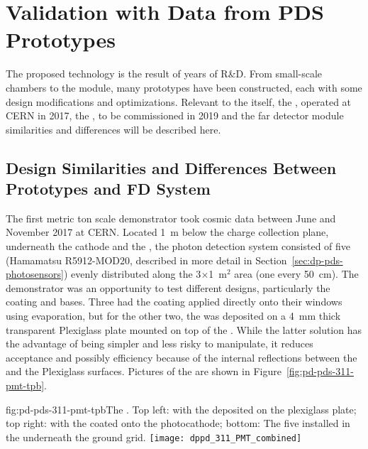 \section{Validation with Data from PDS Prototypes}
\label{sec:dp-pds-prototypes}

The    proposed technology is the result of years of R\&D. From small-scale chambers to the  module, many prototypes have been constructed, each with some design modifications and optimizations. 
Relevant to the  itself, the , operated at CERN in 2017, the , to be commissioned in 2019 and the  far detector module similarities and differences will be described here.

\subsection{Design Similarities and Differences Between Prototypes and FD System}

The first metric ton scale   demonstrator took cosmic data between June and November \num{2017} at CERN. 
Located \SI{1}{m} below the charge collection plane, underneath the cathode and the , the photon detection system consisted of five  (Hamamatsu R5912-MOD20, described in more detail in Section~\ref{sec:dp-pds-photosensors}) evenly distributed along the 3$\times$1~m$^2$ area (one  every \SI{50}{cm}). The demonstrator was an opportunity to test different  designs, particularly the  coating and  bases. Three  had the  coating applied directly onto their windows using evaporation, but for the other two, the  was deposited on a \SI{4}{\mm} thick transparent Plexiglass plate mounted on top of the . 
While the latter solution has the advantage of being simpler and less risky to manipulate, it reduces acceptance and possibly efficiency because of the internal reflections between the  and the Plexiglass surfaces. 
Pictures of the   are shown in Figure~\ref{fig:pd-pds-311-pmt-tpb}.

\begin{dunefigure}[WA105 PDS ]{fig:pd-pds-311-pmt-tpb}{The  . Top left:  with the  deposited on the plexiglass plate; top right:  with the  coated onto the photocathode; bottom: The five  installed in the  underneath the ground grid.}
\texttt{[image: dppd\_311\_PMT\_combined]}
\end{dunefigure}

